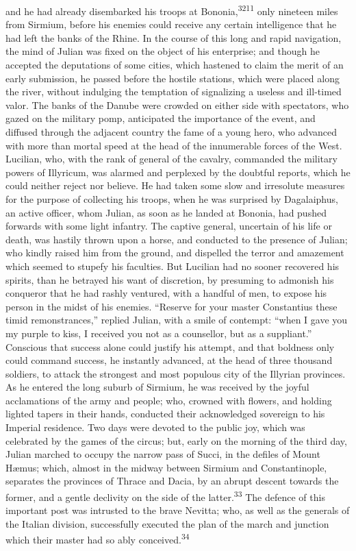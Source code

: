 and he had already disembarked his troops at Bononia,\textsuperscript{3211} only
nineteen miles from Sirmium, before his enemies could receive any
certain intelligence that he had left the banks of the Rhine. In
the course of this long and rapid navigation, the mind of Julian
was fixed on the object of his enterprise; and though he accepted
the deputations of some cities, which hastened to claim the merit
of an early submission, he passed before the hostile stations,
which were placed along the river, without indulging the
temptation of signalizing a useless and ill-timed valor. The
banks of the Danube were crowded on either side with spectators,
who gazed on the military pomp, anticipated the importance of the
event, and diffused through the adjacent country the fame of a
young hero, who advanced with more than mortal speed at the head
of the innumerable forces of the West. Lucilian, who, with the
rank of general of the cavalry, commanded the military powers of
Illyricum, was alarmed and perplexed by the doubtful reports,
which he could neither reject nor believe. He had taken some slow
and irresolute measures for the purpose of collecting his troops,
when he was surprised by Dagalaiphus, an active officer, whom
Julian, as soon as he landed at Bononia, had pushed forwards with
some light infantry. The captive general, uncertain of his life
or death, was hastily thrown upon a horse, and conducted to the
presence of Julian; who kindly raised him from the ground, and
dispelled the terror and amazement which seemed to stupefy his
faculties. But Lucilian had no sooner recovered his spirits, than
he betrayed his want of discretion, by presuming to admonish his
conqueror that he had rashly ventured, with a handful of men, to
expose his person in the midst of his enemies. “Reserve for your
master Constantius these timid remonstrances,” replied Julian,
with a smile of contempt: “when I gave you my purple to kiss, I
received you not as a counsellor, but as a suppliant.” Conscious
that success alone could justify his attempt, and that boldness
only could command success, he instantly advanced, at the head of
three thousand soldiers, to attack the strongest and most
populous city of the Illyrian provinces. As he entered the long
suburb of Sirmium, he was received by the joyful acclamations of
the army and people; who, crowned with flowers, and holding
lighted tapers in their hands, conducted their acknowledged
sovereign to his Imperial residence. Two days were devoted to the
public joy, which was celebrated by the games of the circus; but,
early on the morning of the third day, Julian marched to occupy
the narrow pass of Succi, in the defiles of Mount Hæmus; which,
almost in the midway between Sirmium and Constantinople,
separates the provinces of Thrace and Dacia, by an abrupt descent
towards the former, and a gentle declivity on the side of the
latter.\textsuperscript{33} The defence of this important post was intrusted to
the brave Nevitta; who, as well as the generals of the Italian
division, successfully executed the plan of the march and
junction which their master had so ably conceived.\textsuperscript{34}

